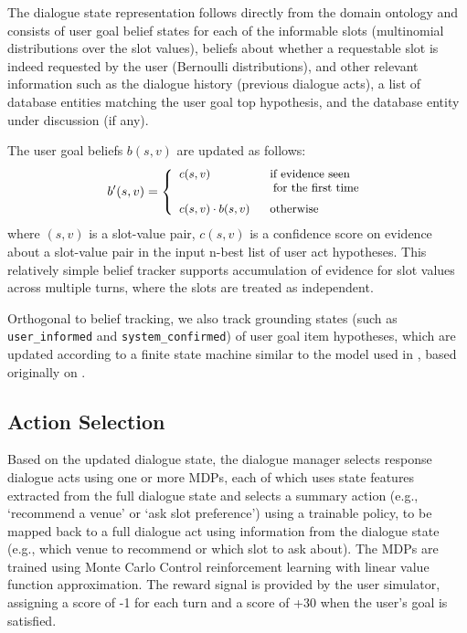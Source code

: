 \documentclass[11pt]{article}
\begin{document}
The dialogue state representation follows directly from the domain ontology and consists of user goal belief states for each of the informable slots (multinomial distributions over the slot values), beliefs about whether a requestable slot is indeed requested by the user (Bernoulli distributions), and other relevant information such as the dialogue history (previous dialogue acts), a list of database entities matching the user goal top hypothesis, and the database entity under discussion (if any).

The user goal beliefs $b(s,v)$ are updated as follows:
\begin{equation}\small
b'(s,v) = \left\{
  \begin{array}{ll}
  c(s,v)                    & \mbox{\small\; if evidence seen} \\
                               & \mbox{\;\; for the first time} \\[2mm]
  c(s,v) \cdot b(s,v) & \mbox{\; otherwise}
  \end{array}
  \right.
\end{equation}
where $(s,v)$ is a slot-value pair, $c(s,v)$ is a confidence score on evidence about a slot-value pair in the input n-best list of user act hypotheses.  This relatively simple belief tracker supports accumulation of evidence for slot values across multiple turns, where the slots are treated as independent.

Orthogonal to belief tracking, we also track grounding states (such as {\tt user\_informed} and {\tt system\_confirmed}) of user goal item hypotheses, which are updated according to a finite state machine similar to the model used in \cite{Young:2010vy}, based originally on \cite{Traum:Phd1994}.

\subsection{Action Selection}

Based on the updated dialogue state, the dialogue manager selects response dialogue acts using one or more MDPs, each of which uses state features extracted from the full dialogue state and selects a summary action (e.g., `recommend a venue' or `ask slot preference') using a trainable policy, to be mapped back to a full dialogue act using information from the dialogue state (e.g., which venue to recommend or which slot to ask about).  The MDPs are trained using Monte Carlo Control reinforcement learning with linear value function approximation.  The reward signal is provided by the user simulator, assigning a score of -1 for each turn and a score of +30 when the user's goal is satisfied.
\end{document}
